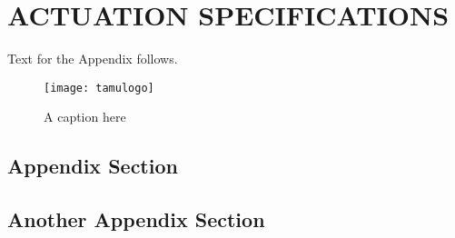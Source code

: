 %
%	 
%


\chapter{ACTUATION SPECIFICATIONS}

Text for the Appendix follows.

\begin{figure}[ht]
    \centering
    \texttt{[image: tamulogo]}
    \caption{A caption here}
\end{figure}

\section{Appendix Section}

\section{Another Appendix Section}


\pagebreak{}
